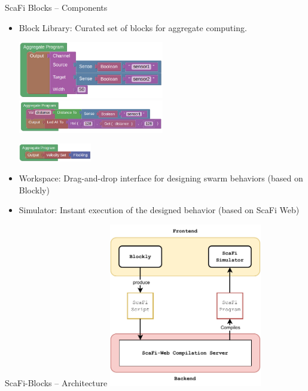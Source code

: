 \documentclass[aspectratio=169]{beamer}
\begin{document}
\begin{frame}{ScaFi Blocks -- Components}
	\begin{itemize}
		\item \alert{Block Library:} Curated set of blocks for aggregate computing.

		\includegraphics[width=0.5\textwidth]{img/channel-visual.png}
		\includegraphics[width=0.5\textwidth]{img/distance-example.png}
		
		\includegraphics[width=0.25\textwidth]{img/movement-example.png}
		\item \alert{Workspace:} Drag-and-drop interface for designing swarm behaviors (based on Blockly)
		\item \alert{Simulator:} Instant execution of the designed behavior (based on ScaFi Web)
	\end{itemize}
\end{frame}
\begin{frame}{ScaFi-Blocks -- Architecture}
	\centering
	\includegraphics[width=0.5\textwidth]{img/scafi-blocks-architecture.drawio.pdf}
\end{frame}
\end{document}
